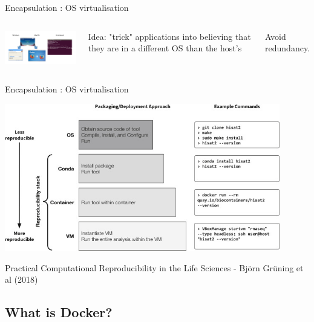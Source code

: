 \begin{frame}{Encapsulation : OS virtualisation}
\begin{columns}

\includegraphics[width=6cm]{02_encapsulation/figures/install_firefox.pdf}

Idea: "trick" applications into believing that they are in a different OS than the host's

Avoid redundancy.

\end{columns}
\end{frame}

\begin{frame}{Encapsulation : OS virtualisation}

\centering\includegraphics[width=12cm]{02_encapsulation/images/encapsulation_reproducibility_scale.png}

Practical Computational Reproducibility in the Life Sciences - Björn Grüning et al (2018) 

\end{frame}


\subsection{What is Docker?}

